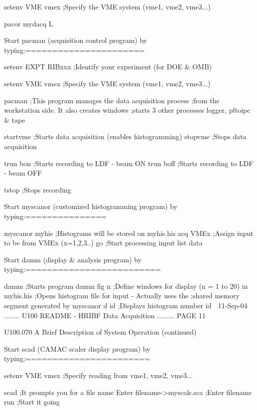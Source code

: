        setenv VME vmex    ;Specify the VME system (vme1, vme2, vme3...)
 
       pacor mydacq L
 
   Start pacman (acquisition control program) by typing:======================
 
       setenv EXPT RIBxxx ;Identify your experiment (for DOE & OMB)
 
       setenv VME vmex    ;Specify the VME system (vme1, vme2, vme3...)
 
       pacman             ;This program manages the data acquisition process
                          ;from the workstation side. It also creates windows
                          ;starts 3 other processes logger, pftoipc & tape
 
       startvme           ;Starts data acquisition (enables histogramming)
       stopvme            ;Stops  data acquisition
 
       trun bon           ;Starts recording to LDF - beam ON
       trun boff          ;Starts recording to LDF - beam OFF
 
       tstop              ;Stops  recording
 
   Start myscanor (customized histogramming program) by typing:===============
 
       myscanor myhis     ;Histograms will be stored on myhis.his
       acq VMEx           ;Assign input to be from VMEx (x=1,2,3..)
       go                 ;Start processing input list data
 
   Start damm (display & analysis program) by typing:=========================
 
       damm               ;Starts program damm
       fig n              ;Define windows for display (n = 1 to 20)
       in myhis.his       ;Opens histogram file for input - Actually uses the
                          ;shared memory segment generated by myscanor
       d id               ;Displays histogram number id
    
   11-Sep-04 ........ U100  README - HRIBF Data Acquisition ......... PAGE  11
 
 
   U100.070  A Brief Description of System Operation (continued)
 
   Start scad (CAMAC scaler display program) by typing:=======================
 
        setenv VME vmex              ;Specify reading from vme1, vme2, vme3...
 
        scad                         ;It prompts you for a file name
        Enter filename->myscals.sca  ;Enter filename
        run                          ;Start it going
 
